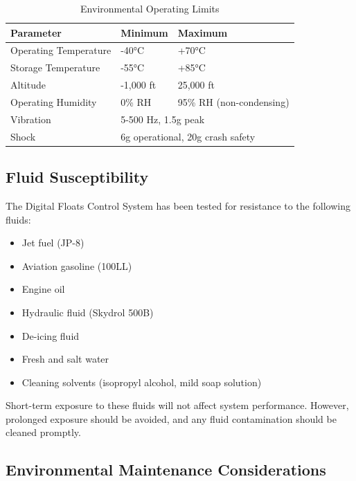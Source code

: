 \documentclass[12pt,a4paper,twoside,openright]{book}
\newcommand{\tabletextfont}{\normalfont\rmfamily}
\newcommand{\tableheadfont}{\normalfont\bfseries}
\begin{document}
\begin{table}[h]
\centering
\setlength{\tabcolsep}{5pt} %
\begin{tabular}{|p{}|p{}|p{}|}
\hline
\tableheadfont\textbf{Parameter} & \tableheadfont\textbf{Minimum} & \tableheadfont\textbf{Maximum} \\
\hline
\tabletextfont Operating Temperature & -40°C & +70°C \\
\hline
\tabletextfont Storage Temperature & -55°C & +85°C \\
\hline
\tabletextfont Altitude & -1,000 ft & 25,000 ft \\
\hline
\tabletextfont Operating Humidity & 0\% RH & 95\% RH (non-condensing) \\
\hline
\tabletextfont Vibration & \multicolumn{2}{p{0.6\textwidth}|}{5-500 Hz, 1.5g peak} \\
\hline
\tabletextfont Shock & \multicolumn{2}{p{0.6\textwidth}|}{6g operational, 20g crash safety} \\
\hline
\end{tabular}
\caption{Environmental Operating Limits}
\end{table}

\subsection{Fluid Susceptibility}

The Digital Floats Control System has been tested for resistance to the following fluids:

\begin{itemize}
    \item Jet fuel (JP-8)
    \item Aviation gasoline (100LL)
    \item Engine oil
    \item Hydraulic fluid (Skydrol 500B)
    \item De-icing fluid
    \item Fresh and salt water
    \item Cleaning solvents (isopropyl alcohol, mild soap solution)
\end{itemize}

Short-term exposure to these fluids will not affect system performance. However, prolonged exposure should be avoided, and any fluid contamination should be cleaned promptly.

\subsection{Environmental Maintenance Considerations}
\end{document}
